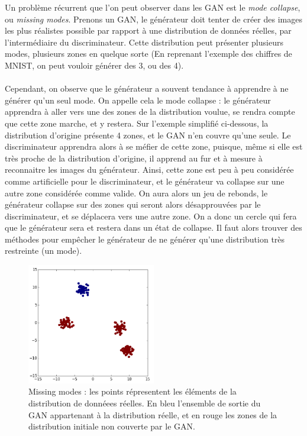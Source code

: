 Un problème récurrent que l'on peut observer dans les GAN est le \textit{mode collapse}, ou \textit{missing modes}. Prenons un GAN, le générateur doit tenter de créer des images les plus réalistes possible par rapport à une distribution de données réelles, par l'intermédiaire du discriminateur. Cette distribution peut présenter plusieurs modes, plusieurs zones en quelque sorte (En reprenant l'exemple des chiffres de MNIST, on peut vouloir générer des 3, ou des 4). 
\\ \\
Cependant, on observe que le générateur a souvent tendance à apprendre à ne générer qu'un seul mode. On appelle cela le mode collapse : le générateur apprendra à aller vers une des zones de la distribution voulue, se rendra compte que cette zone marche, et y restera. 
Sur l'exemple simplifié ci-dessous, la distribution d'origine présente 4 zones, et le GAN n'en couvre qu'une seule.
Le discriminateur apprendra alors à se méfier de cette zone, puisque, même si elle est très proche de la distribution d'origine, il apprend au fur et à mesure à reconnaitre les images du générateur. Ainsi, cette zone est peu à peu considérée comme artificielle pour le discriminateur, et le générateur va collapse sur une autre zone considérée comme valide. On aura alors un jeu de rebonds, le générateur collapse sur des zones qui seront alors désapprouvées par le discriminateur, et se déplacera vers une autre zone. 
On a donc un cercle qui fera que le générateur sera et restera dans un état de collapse. 
Il faut alors trouver des méthodes pour empêcher le générateur de ne générer qu'une distribution très restreinte (un mode).

\begin{figure}[h]
\begin{center}
\includegraphics[width=0.5\textwidth]{images/missing_modes.png}\caption{Missing modes : les points répresentent les éléments de la distribution de donnéees réelles. En bleu l'ensemble de sortie du GAN appartenant à la distribution réelle, et en rouge les zones de la distribution initiale non couverte par le GAN.}
\end{center}
\end{figure} 

